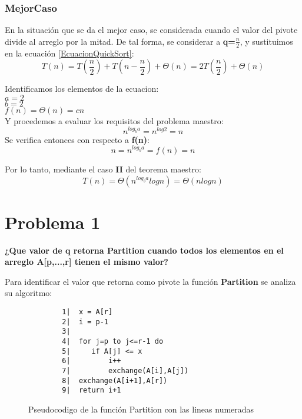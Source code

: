        \subsubsection*{MejorCaso}
            En la situación que se da el mejor caso, se considerada cuando el valor del pivote divide al arreglo por la mitad. De tal forma, se considerar a \textbf{q=$\frac{n}{2}$}, y sustituimos en la ecuación \ref{EcuacionQuickSort}:
            \begin{equation*}
                T(n)=T\left(\frac{n}{2}\right)+T\left(n-\frac{n}{2}\right)+\Theta(n) =2T\left(\frac{n}{2}\right)+\Theta(n)
            \end{equation*}
            
            Identificamos los elementos de la ecuacion:\\
            $a=2$\\
            $b=2$\\
            $f(n)=\Theta(n) = cn$\\
            Y procedemos a evaluar los requisitos del problema maestro:
            \begin{equation*}
                n^{log_ba}=n^{log2}=n
            \end{equation*}
            Se verifica entonces con respecto a \textbf{f(n)}:
            \begin{equation*}
                n=n^{log_ba}=f(n)=n
            \end{equation*}
            
            Por lo tanto, mediante el caso \textbf{II} del teorema maestro:
            \begin{equation*}
                T(n) = \Theta (n^{log_ba}logn) = \Theta(nlogn)
            \end{equation*}
    
\section*{Problema 1}
    \textbf{¿Que valor de q retorna Partition cuando todos los elementos en el arreglo A[p,...,r] tienen el mismo valor?}\\
    
    \hfill \break
    
    Para identificar el valor que retorna como pivote la función \textbf{Partition} se analiza su algoritmo:
    \begin{figure}
        \centering\begin{verbatim}
        1|  x = A[r]
        2|  i = p-1
        3| 
        4|  for j=p to j<=r-1 do
        5|     if A[j] <= x
        6|         i++
        7|         exchange(A[i],A[j])
        8|  exchange(A[i+1],A[r])
        9|  return i+1
    \end{verbatim}
        \caption{Pseudocodigo de la función Partition con las lineas numeradas}
        \label{PseudocodigoPartitionNumerado}
    \end{figure}
    
